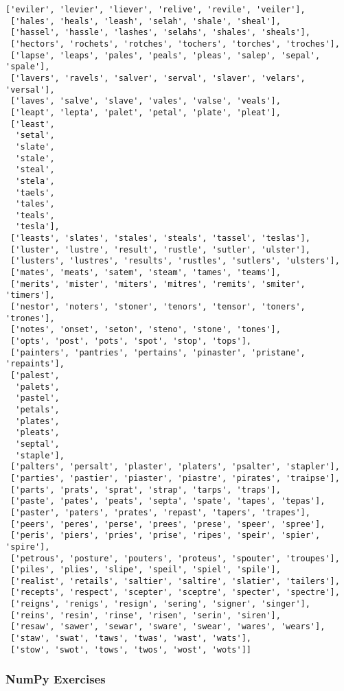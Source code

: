 \documentclass[11pt]{article}
\begin{document}
\begin{tcolorbox}[breakable, size=fbox, boxrule=.5pt, pad at break*=1mm, opacityfill=0]
\begin{Verbatim}[commandchars=\\\{\}]
 ['eviler', 'levier', 'liever', 'relive', 'revile', 'veiler'],
 ['hales', 'heals', 'leash', 'selah', 'shale', 'sheal'],
 ['hassel', 'hassle', 'lashes', 'selahs', 'shales', 'sheals'],
 ['hectors', 'rochets', 'rotches', 'tochers', 'torches', 'troches'],
 ['lapse', 'leaps', 'pales', 'peals', 'pleas', 'salep', 'sepal', 'spale'],
 ['lavers', 'ravels', 'salver', 'serval', 'slaver', 'velars', 'versal'],
 ['laves', 'salve', 'slave', 'vales', 'valse', 'veals'],
 ['leapt', 'lepta', 'palet', 'petal', 'plate', 'pleat'],
 ['least',
  'setal',
  'slate',
  'stale',
  'steal',
  'stela',
  'taels',
  'tales',
  'teals',
  'tesla'],
 ['leasts', 'slates', 'stales', 'steals', 'tassel', 'teslas'],
 ['luster', 'lustre', 'result', 'rustle', 'sutler', 'ulster'],
 ['lusters', 'lustres', 'results', 'rustles', 'sutlers', 'ulsters'],
 ['mates', 'meats', 'satem', 'steam', 'tames', 'teams'],
 ['merits', 'mister', 'miters', 'mitres', 'remits', 'smiter', 'timers'],
 ['nestor', 'noters', 'stoner', 'tenors', 'tensor', 'toners', 'trones'],
 ['notes', 'onset', 'seton', 'steno', 'stone', 'tones'],
 ['opts', 'post', 'pots', 'spot', 'stop', 'tops'],
 ['painters', 'pantries', 'pertains', 'pinaster', 'pristane', 'repaints'],
 ['palest',
  'palets',
  'pastel',
  'petals',
  'plates',
  'pleats',
  'septal',
  'staple'],
 ['palters', 'persalt', 'plaster', 'platers', 'psalter', 'stapler'],
 ['parties', 'pastier', 'piaster', 'piastre', 'pirates', 'traipse'],
 ['parts', 'prats', 'sprat', 'strap', 'tarps', 'traps'],
 ['paste', 'pates', 'peats', 'septa', 'spate', 'tapes', 'tepas'],
 ['paster', 'paters', 'prates', 'repast', 'tapers', 'trapes'],
 ['peers', 'peres', 'perse', 'prees', 'prese', 'speer', 'spree'],
 ['peris', 'piers', 'pries', 'prise', 'ripes', 'speir', 'spier', 'spire'],
 ['petrous', 'posture', 'pouters', 'proteus', 'spouter', 'troupes'],
 ['piles', 'plies', 'slipe', 'speil', 'spiel', 'spile'],
 ['realist', 'retails', 'saltier', 'saltire', 'slatier', 'tailers'],
 ['recepts', 'respect', 'scepter', 'sceptre', 'specter', 'spectre'],
 ['reigns', 'renigs', 'resign', 'sering', 'signer', 'singer'],
 ['reins', 'resin', 'rinse', 'risen', 'serin', 'siren'],
 ['resaw', 'sawer', 'sewar', 'sware', 'swear', 'wares', 'wears'],
 ['staw', 'swat', 'taws', 'twas', 'wast', 'wats'],
 ['stow', 'swot', 'tows', 'twos', 'wost', 'wots']]
\end{Verbatim}
\end{tcolorbox}
        
    \hypertarget{numpy-exercises}{%
\subsubsection{NumPy Exercises}\label{numpy-exercises}}
\end{document}
